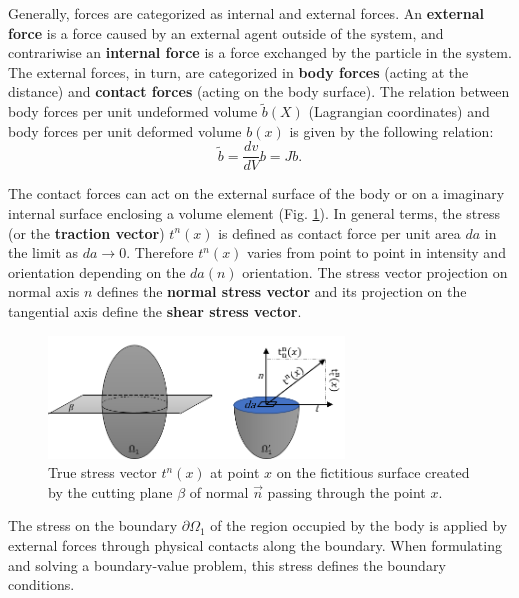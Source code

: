 Generally, forces are categorized as internal and external forces. An \textbf{external force } is a force caused by an external agent outside of the system, and contrariwise an \textbf{internal force} is a force exchanged by the particle in the system. The external forces, in turn, are categorized in \textbf{body forces} (acting at the distance) and \textbf{contact forces} (acting on the body surface). The relation between body forces per unit undeformed volume $\tilde{b}(X)$ (Lagrangian coordinates) and body forces per unit deformed volume $b(x)$ is given by the following relation:
\begin{equation}
\tilde{b} = \frac{dv}{dV} b = Jb.
\end{equation}

The contact forces can act on the external surface of the body or on a imaginary internal surface enclosing a volume element (Fig. \ref{internalcontactForceDefinition}). 
In general terms, the stress (or the \textbf{traction vector}) $t^n(x)$ is defined as contact force per unit area $da$ in the limit as $da \rightarrow 0$. Therefore $t^n(x)$ varies from point to point in intensity and orientation depending on the $da(n)$ orientation.  The stress vector projection on normal axis $n$ defines the \textbf{normal stress vector} and its projection on the tangential axis define the \textbf{shear stress vector}.


\begin{figure}
\begin{center}
\includegraphics[width=0.7\textwidth,keepaspectratio]{figures/internalcontactForceDefinition.png} 
\caption[]{True stress vector $t^n(x)$ at point $x$ on the fictitious surface created  by the cutting plane $\beta$ of normal  $\overrightarrow n$ passing through the point $x$. }
\label{internalcontactForceDefinition}
\end{center}
\end{figure}

The stress on the boundary $\partial \Omega_1$ of the region occupied by the body is applied by external forces through physical contacts along the boundary. When formulating and solving a boundary-value problem, this stress defines the boundary conditions.


